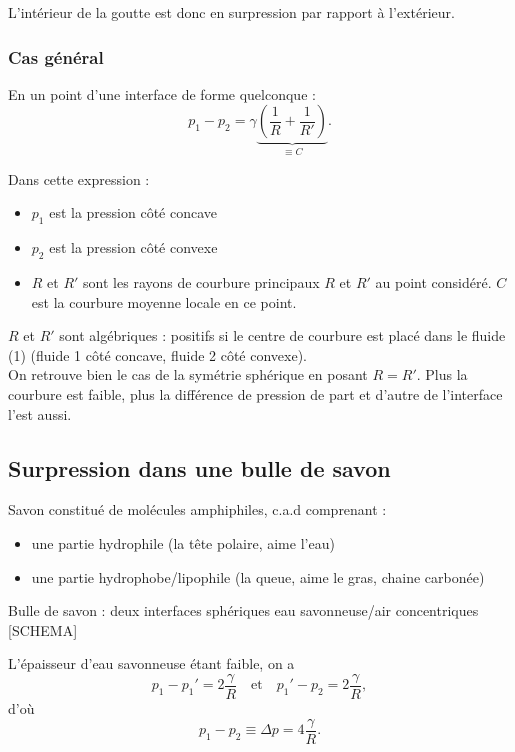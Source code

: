 \documentclass[11pt,a4paper]{report}
\begin{document}
L'intérieur de la goutte est donc en surpression par rapport à l'extérieur.

\subsubsection{Cas général}

En un point d'une interface de forme quelconque :
\begin{equation}
	\boxed{p_1 - p_2 = \gamma \underbrace{\left(\frac{1}{R} 
	+ \frac{1}{R'}\right)}_{\displaystyle{\equiv C}}}.
\end{equation}

Dans cette expression :
\begin{itemize}
	\item $p_1$ est la pression côté concave
	\item $p_2$ est la pression côté convexe
	\item $R$ et $R'$ sont les rayons de courbure principaux $R$ et $R'$ au point considéré. $C$ est la courbure moyenne locale en ce point.\\
\end{itemize}

$R$ et $R'$ sont algébriques : positifs si le centre de courbure est placé dans le fluide (1) (fluide 1 côté concave, fluide 2 côté convexe).\\

On retrouve bien le cas de la symétrie sphérique en posant $R = R'$. Plus la courbure est faible, plus la différence de pression de part et d'autre de l'interface l'est aussi.

\subsection{Surpression dans une bulle de savon}

Savon constitué de molécules amphiphiles, c.a.d comprenant :
\begin{itemize}
	\item une partie hydrophile (la tête polaire, aime l'eau)
	\item une partie hydrophobe/lipophile (la queue, aime le gras, chaine carbonée)
\end{itemize}

Bulle de savon : deux interfaces sphériques eau savonneuse/air concentriques [SCHEMA]

L'épaisseur d'eau savonneuse étant faible, on a 
\begin{equation}
	p_1 - p_1' = 2\frac{\gamma}{R} \quad\text{et}\quad p_1' - p_2 = 2\frac{\gamma}{R},
\end{equation}
d'où
\begin{equation}
	p_1 - p_2 \equiv \Delta p = 4\frac{\gamma}{R}.
\end{equation}
\end{document}
